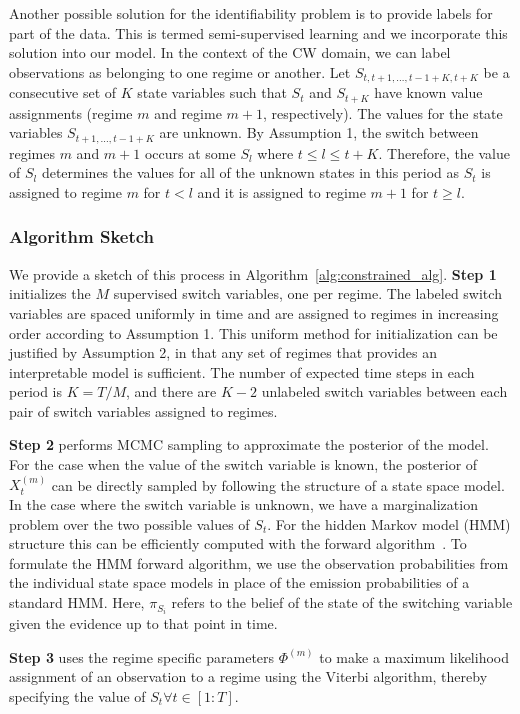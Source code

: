 Another possible solution for the identifiability problem is to provide labels for part of the data. This is termed semi-supervised learning and we incorporate this solution into our model. In the context of the CW domain, we can label observations as belonging to one regime or another. Let $S_{t, t+1,\ldots, t-1+K,t+K}$ be a consecutive set of $K$ state variables such that $S_t$ and $S_{t+K}$ have known value assignments (regime $m$ and regime $m+1$, respectively). The values for the state variables $S_{t+1,\ldots,t-1+K}$ are unknown. By Assumption 1, the switch between regimes $m$ and $m+1$ occurs at some $S_l$ where $t \leq l \leq t+K$. Therefore, the value of $S_l$ determines the values for all of the unknown states in this period as $S_t$ is assigned to regime $m$ for $t<l$ and it is assigned to regime $m+1$ for $t \geq l$.

\subsubsection{Algorithm Sketch}
We provide a sketch of this process in Algorithm~\ref{alg:constrained_alg}. \textbf{Step 1} initializes the $M$ supervised switch variables, one per regime. The labeled switch variables are spaced uniformly in time and are assigned to regimes in increasing order according to Assumption 1. This uniform method for initialization can be justified  by Assumption 2, in that  any set of regimes  that provides an interpretable model is sufficient. The number of expected  time steps in each period is $K=T/M$, and there are  $K-2$ unlabeled switch variables between each pair of  switch variables assigned to regimes.

\textbf{Step 2} performs MCMC sampling to approximate the posterior of the model. For the case when the value of the switch variable is known, the posterior of $X^{(m)}_t$ can be directly sampled by following the structure of a state space model. In the case where the switch variable is unknown, we have a marginalization problem over the two possible values of $S_t$. For the hidden Markov model (HMM) structure this can be efficiently computed with the forward algorithm~\citep{shumway2000time}. To formulate the HMM forward algorithm, we use the observation probabilities from the individual state space models in place of the emission probabilities of a standard HMM. Here, $\pi_{S_i}$ refers to the belief of the state of the switching variable given the evidence up to that point in time.

\textbf{Step 3} uses the regime specific parameters $\Phi^{(m)}$ to make a maximum likelihood assignment of an observation to a regime using the Viterbi algorithm, thereby specifying the value of $S_t \forall t \in [1:T]$.


